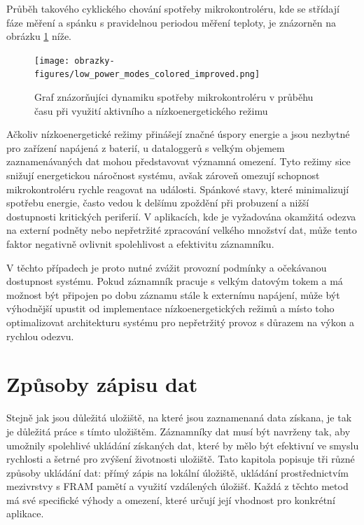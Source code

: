 Průběh takového cyklického chování spotřeby mikrokontroléru, kde se střídají fáze měření a spánku s pravidelnou periodou měření teploty, je znázorněn na obrázku \ref{fig:low-power-modes} níže.

\begin{figure}[h]
    \centering
    \texttt{[image: obrazky-figures/low\_power\_modes\_colored\_improved.png]}
    
    \caption{Graf znázorňujíci dynamiku spotřeby mikrokontroléru v průběhu času při využití aktivního a nízkoenergetického režimu}
    \label{fig:low-power-modes}
\end{figure}

Ačkoliv nízkoenergetické režimy přinášejí značné úspory energie a jsou nezbytné pro zařízení napájená z baterií, u dataloggerů s velkým objemem zaznamenávaných dat mohou představovat významná omezení. Tyto režimy sice snižují energetickou náročnost systému, avšak zároveň omezují schopnost mikrokontroléru rychle reagovat na události. Spánkové stavy, které minimalizují spotřebu energie, často vedou k delšímu zpoždění při probuzení a nižší dostupnosti kritických periferií. V aplikacích, kde je vyžadována okamžitá odezva na externí podněty nebo nepřetržité zpracování velkého množství dat, může tento faktor negativně ovlivnit spolehlivost a efektivitu záznamníku. \cite{embedded_low_power_modes}

V těchto případech je proto nutné zvážit provozní podmínky a očekávanou dostupnost systému. Pokud záznamník pracuje s velkým datovým tokem a má možnost být připojen po dobu záznamu stále k externímu napájení, může být výhodnější upustit od implementace nízkoenergetických režimů a místo toho optimalizovat architekturu systému pro nepřetržitý provoz s důrazem na výkon a rychlou odezvu. \cite{analog_devices_low_power_modes}


\section{Způsoby zápisu dat}
Stejně jak jsou důležitá uložiště, na které jsou zaznamenaná data získana, je tak je důležitá práce s tímto uložištěm. Záznamníky dat musí být navrženy tak, aby umožnily spolehlivé ukládání získaných dat, které by mělo být efektivní ve smyslu rychlosti a šetrné pro zvýšení životnosti uložiště. Tato kapitola popisuje tři různé způsoby ukládání dat: přímý zápis na lokální úložiště, ukládání prostřednictvím mezivrstvy s FRAM pamětí a využití vzdálených úložišť. Každá z těchto metod má své specifické výhody a omezení, které určují její vhodnost pro konkrétní aplikace.

